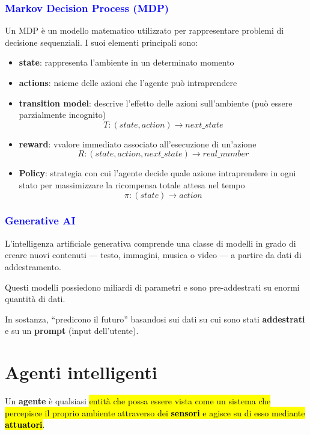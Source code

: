 \documentclass[a4paper, 12pt]{book}
\begin{document}
    \subsection*{\textcolor{blue}{Markov Decision Process (MDP)}}
    Un MDP è un modello matematico utilizzato per rappresentare problemi di decisione sequenziali. I suoi elementi principali sono:
    \begin{itemize}
      \item \textbf{state}: rappresenta l’ambiente in un determinato momento
      \item \textbf{actions}: nsieme delle azioni che l’agente può intraprendere
      \item \textbf{transition model}: descrive l’effetto delle azioni sull’ambiente (può essere parzialmente incognito)
        \[
          T: (state, action) \to next\_state
        \] 
      \item \textbf{reward}: vvalore immediato associato all’esecuzione di un’azione
        \[
          R: (state, action, next\_state) \to real\_number
        \] 
      \item \textbf{Policy}: strategia con cui l’agente decide quale azione intraprendere in ogni stato per massimizzare la ricompensa totale attesa nel tempo
        \[
          \pi: (state) \to action
        \] 
    \end{itemize}

    \subsection*{\textcolor{blue}{Generative AI}}
    L’intelligenza artificiale generativa comprende una classe di modelli in grado di creare nuovi contenuti — testo, immagini, musica o video — a partire da dati di addestramento.

    Questi modelli possiedono miliardi di parametri e sono pre-addestrati su enormi quantità di dati.

    In sostanza, “predicono il futuro” basandosi sui dati su cui sono stati \textbf{addestrati} e su un \textbf{prompt} (input dell’utente).



    \chapter*{Agenti intelligenti}
    Un \textbf{agente} è qualsiasi \hl{entità che possa essere vista come un sistema che percepisce il proprio ambiente attraverso dei \textbf{sensori} e agisce su di esso mediante \textbf{attuatori}}.
\end{document}
